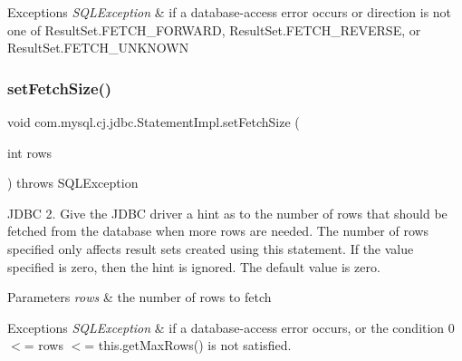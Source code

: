 \begin{DoxyExceptions}{Exceptions}
{\em S\+Q\+L\+Exception} & if a database-\/access error occurs or direction is not one of Result\+Set.\+F\+E\+T\+C\+H\+\_\+\+F\+O\+R\+W\+A\+RD, Result\+Set.\+F\+E\+T\+C\+H\+\_\+\+R\+E\+V\+E\+R\+SE, or Result\+Set.\+F\+E\+T\+C\+H\+\_\+\+U\+N\+K\+N\+O\+WN \\
\hline
\end{DoxyExceptions}
\mbox{\label{classcom_1_1mysql_1_1cj_1_1jdbc_1_1_statement_impl_ad68efa27b29ed10cdc35f711dad0d16f}} 
\subsubsection{\texorpdfstring{set\+Fetch\+Size()}{setFetchSize()}}
{\footnotesize\ttfamily void com.\+mysql.\+cj.\+jdbc.\+Statement\+Impl.\+set\+Fetch\+Size (\begin{DoxyParamCaption}\item[{int}]{rows }\end{DoxyParamCaption}) throws S\+Q\+L\+Exception}

J\+D\+BC 2. Give the J\+D\+BC driver a hint as to the number of rows that should be fetched from the database when more rows are needed. The number of rows specified only affects result sets created using this statement. If the value specified is zero, then the hint is ignored. The default value is zero.


\begin{DoxyParams}{Parameters}
{\em rows} & the number of rows to fetch\\
\hline
\end{DoxyParams}

\begin{DoxyExceptions}{Exceptions}
{\em S\+Q\+L\+Exception} & if a database-\/access error occurs, or the condition 0 $<$= rows $<$= this.\+get\+Max\+Rows() is not satisfied. \\
\hline
\end{DoxyExceptions}
\mbox{\label{classcom_1_1mysql_1_1cj_1_1jdbc_1_1_statement_impl_a903fdf158910d8f86a7417699ac93064}} 
